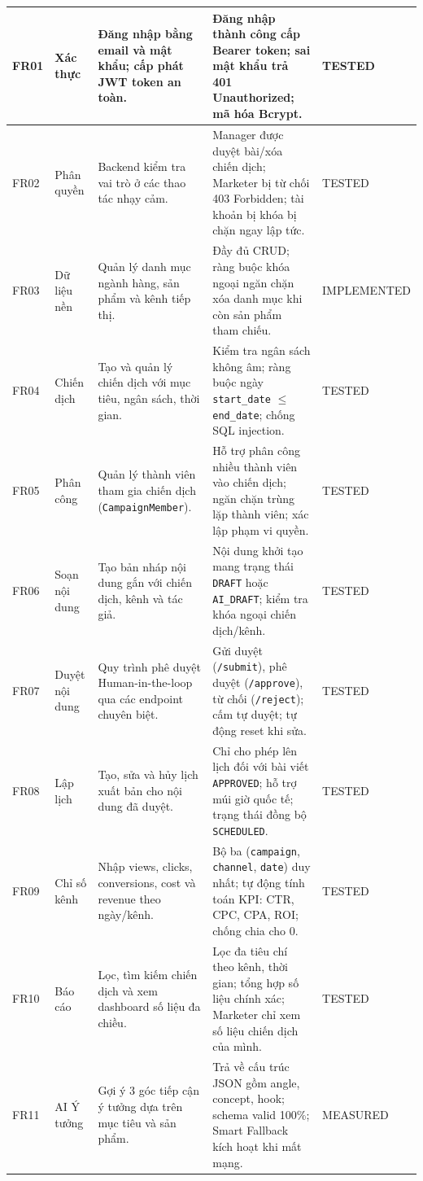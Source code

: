 \begin{small}
\begin{longtable}{|C{0.9cm}|L{1.75cm}|L{3.4cm}|L{4.3cm}|C{2.65cm}|}
FR01 & Xác thực & Đăng nhập bằng email và mật khẩu; cấp phát JWT token an toàn. & Đăng nhập thành công cấp Bearer token; sai mật khẩu trả 401 Unauthorized; mã hóa Bcrypt. & TESTED\\
\hline
FR02 & Phân quyền & Backend kiểm tra vai trò ở các thao tác nhạy cảm. & Manager được duyệt bài/xóa chiến dịch; Marketer bị từ chối 403 Forbidden; tài khoản bị khóa bị chặn ngay lập tức. & TESTED\\
\hline
FR03 & Dữ liệu nền & Quản lý danh mục ngành hàng, sản phẩm và kênh tiếp thị. & Đầy đủ CRUD; ràng buộc khóa ngoại ngăn chặn xóa danh mục khi còn sản phẩm tham chiếu. & IMPLEMENTED\\
\hline
FR04 & Chiến dịch & Tạo và quản lý chiến dịch với mục tiêu, ngân sách, thời gian. & Kiểm tra ngân sách không âm; ràng buộc ngày \texttt{start\_date} $\le$ \texttt{end\_date}; chống SQL injection. & TESTED\\
\hline
FR05 & Phân công & Quản lý thành viên tham gia chiến dịch (\texttt{CampaignMember}). & Hỗ trợ phân công nhiều thành viên vào chiến dịch; ngăn chặn trùng lặp thành viên; xác lập phạm vi quyền. & TESTED\\
\hline
FR06 & Soạn nội dung & Tạo bản nháp nội dung gắn với chiến dịch, kênh và tác giả. & Nội dung khởi tạo mang trạng thái \texttt{DRAFT} hoặc \texttt{AI\_DRAFT}; kiểm tra khóa ngoại chiến dịch/kênh. & TESTED\\
\hline
FR07 & Duyệt nội dung & Quy trình phê duyệt Human-in-the-loop qua các endpoint chuyên biệt. & Gửi duyệt (\texttt{/submit}), phê duyệt (\texttt{/approve}), từ chối (\texttt{/reject}); cấm tự duyệt; tự động reset khi sửa. & TESTED\\
\hline
FR08 & Lập lịch & Tạo, sửa và hủy lịch xuất bản cho nội dung đã duyệt. & Chỉ cho phép lên lịch đối với bài viết \texttt{APPROVED}; hỗ trợ múi giờ quốc tế; trạng thái đồng bộ \texttt{SCHEDULED}. & TESTED\\
\hline
FR09 & Chỉ số kênh & Nhập views, clicks, conversions, cost và revenue theo ngày/kênh. & Bộ ba (\texttt{campaign}, \texttt{channel}, \texttt{date}) duy nhất; tự động tính toán KPI: CTR, CPC, CPA, ROI; chống chia cho 0. & TESTED\\
\hline
FR10 & Báo cáo & Lọc, tìm kiếm chiến dịch và xem dashboard số liệu đa chiều. & Lọc đa tiêu chí theo kênh, thời gian; tổng hợp số liệu chính xác; Marketer chỉ xem số liệu chiến dịch của mình. & TESTED\\
\hline
FR11 & AI Ý tưởng & Gợi ý 3 góc tiếp cận ý tưởng dựa trên mục tiêu và sản phẩm. & Trả về cấu trúc JSON gồm angle, concept, hook; schema valid 100\%; Smart Fallback kích hoạt khi mất mạng. & MEASURED\\

\end{longtable}
\end{small}
